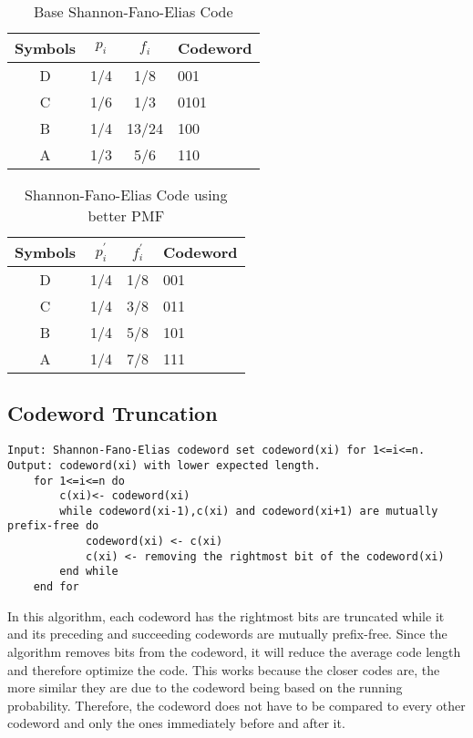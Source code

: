 \documentclass[10pt,letterpaper,notitlepage,draft]{article}
\theoremstyle{definition}
\begin{document}
\begin{table}[h]
\begin{center}
\begin{tabular}{|c|c|c|l|}
\hline
Symbols & $p_i$ & $f_i$ & Codeword \\ 
\hline 
\hline
D & 1/4 & 1/8 & 001 \\
\hline
C & 1/6 & 1/3 & 0101 \\
\hline
B & 1/4 & 13/24 & 100 \\
\hline
A & 1/3 & 5/6 & 110 \\
\hline
\end{tabular}
\end{center}
\caption{Base Shannon-Fano-Elias Code}\label{t1}
\end{table}

\begin{table}[h]
\begin{center}
\begin{tabular}{|c|c|c|l|}
\hline
Symbols & $p_i^\prime$ & $f_i^\prime$ & Codeword \\ 
\hline 
\hline
D & 1/4 & 1/8 & 001 \\
\hline
C & 1/4 & 3/8 & 011 \\
\hline
B & 1/4 & 5/8 & 101 \\
\hline
A & 1/4 & 7/8 & 111 \\
\hline
\end{tabular}
\end{center}
\caption{Shannon-Fano-Elias Code using better PMF}\label{t2}
\end{table}


\subsection{Codeword Truncation}

\begin{lstlisting}[breaklines]
Input: Shannon-Fano-Elias codeword set codeword(xi) for 1<=i<=n.
Output: codeword(xi) with lower expected length.
    for 1<=i<=n do
        c(xi)<- codeword(xi)
        while codeword(xi-1),c(xi) and codeword(xi+1) are mutually prefix-free do
            codeword(xi) <- c(xi)
            c(xi) <- removing the rightmost bit of the codeword(xi)
        end while
    end for
\end{lstlisting}

In this algorithm, each codeword has the rightmost bits are truncated while it and its preceding and succeeding codewords are mutually prefix-free. Since the algorithm removes bits from the codeword, it will reduce the average code length and therefore optimize the code. This works because the closer codes are, the more similar they are due to the codeword being based on the running probability. Therefore, the codeword does not have to be compared to every other codeword and only the ones immediately before and after it. 
\end{document}
